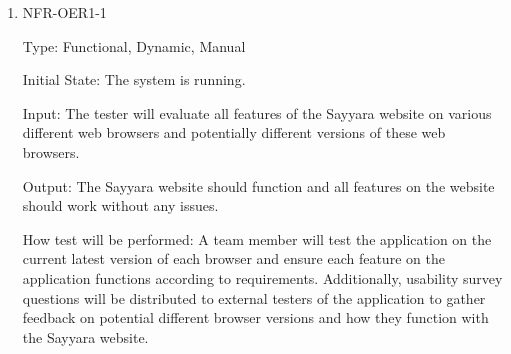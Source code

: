 \documentclass[12pt, titlepage]{article}
\begin{document}
\begin{enumerate}
					
\item{NFR-OER1-1\\}

Type: Functional, Dynamic, Manual
					
Initial State: The system is running.
					
Input: The tester will evaluate all features of the Sayyara website on various different web browsers and potentially different versions of these web browsers.
					
Output: The Sayyara website should function and all features on the website should work without any issues.
					
How test will be performed: A team member will test the application on the current latest version of each browser and ensure each feature on the application functions according to requirements. Additionally, usability survey questions will be distributed to external testers of the application to gather feedback on potential different browser versions and how they function with the Sayyara website.

\end{enumerate}




					
					
					
					
\end{document}
